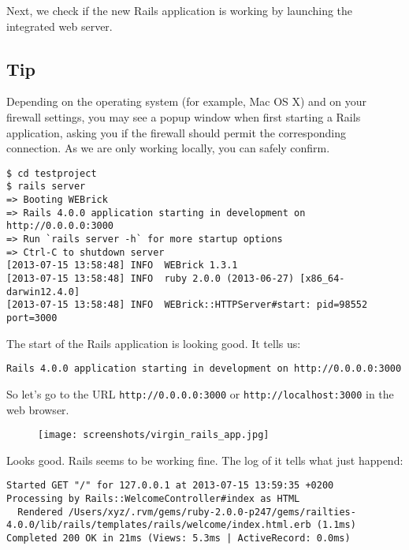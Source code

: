 \documentclass[a4paper]{book}
\begin{document}
Next, we check if the new Rails application is working by launching the integrated web server.

\subsection{Tip}\label{tip-2}

Depending on the operating system (for example, Mac OS X) and on your firewall settings, you may see a popup window when first starting a Rails application, asking you if the firewall should permit the corresponding connection. As we are only working locally, you can safely confirm.

\begin{shaded}\begin{verbatim}
$ cd testproject
$ rails server
=> Booting WEBrick
=> Rails 4.0.0 application starting in development on http://0.0.0.0:3000
=> Run `rails server -h` for more startup options
=> Ctrl-C to shutdown server
[2013-07-15 13:58:48] INFO  WEBrick 1.3.1
[2013-07-15 13:58:48] INFO  ruby 2.0.0 (2013-06-27) [x86_64-darwin12.4.0]
[2013-07-15 13:58:48] INFO  WEBrick::HTTPServer#start: pid=98552 port=3000
\end{verbatim}\end{shaded}

The start of the Rails application is looking good. It tells us:

\begin{shaded}\begin{verbatim}
Rails 4.0.0 application starting in development on http://0.0.0.0:3000
\end{verbatim}\end{shaded}

So let's go to the URL \texttt{http://0.0.0.0:3000} or \texttt{http://localhost:3000} in the web browser.

\begin{figure}[htbp]
\centering
\texttt{[image: screenshots/virgin\_rails\_app.jpg]}
\end{figure}

Looks good. Rails seems to be working fine. The log of it tells what just happend:

\begin{shaded}\begin{verbatim}
Started GET "/" for 127.0.0.1 at 2013-07-15 13:59:35 +0200
Processing by Rails::WelcomeController#index as HTML
  Rendered /Users/xyz/.rvm/gems/ruby-2.0.0-p247/gems/railties-4.0.0/lib/rails/templates/rails/welcome/index.html.erb (1.1ms)
Completed 200 OK in 21ms (Views: 5.3ms | ActiveRecord: 0.0ms)
\end{verbatim}\end{shaded}
\end{document}
